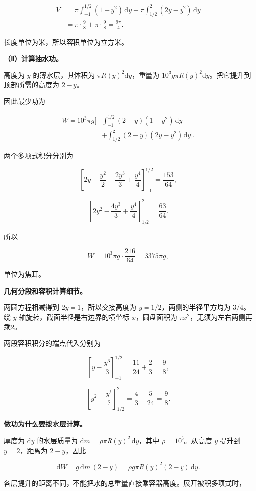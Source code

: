 \documentclass[UTF8,11pt,fontset=windows]{ctexart}
\begin{document}
$$
\begin{aligned}
V&=\pi\int_{-1}^{1/2}(1-y^2)\,\mathrm dy
+\pi\int_{1/2}^2(2y-y^2)\,\mathrm dy\\
&=\pi\cdot\frac98+\pi\cdot\frac98
=\frac{9\pi}{4}.
\end{aligned}
$$

长度单位为米，所以容积单位为立方米。

\textbf{（Ⅱ）计算抽水功。}

高度为 $y$ 的薄水层，其体积为 $\pi R(y)^2\mathrm dy$，重量为 $10^3g\pi R(y)^2\mathrm dy$。把它提升到顶部所需的高度为 $2-y$。

因此最少功为

$$
\begin{aligned}
W=10^3\pi g\bigg[&\int_{-1}^{1/2}(2-y)(1-y^2)\,\mathrm dy\\
&+\int_{1/2}^2(2-y)(2y-y^2)\,\mathrm dy\bigg].
\end{aligned}
$$

两个多项式积分分别为

$$
\left[2y-\frac{y^2}{2}-\frac{2y^3}{3}+\frac{y^4}{4}\right]_{-1}^{1/2}=\frac{153}{64},
$$

$$
\left[2y^2-\frac{4y^3}{3}+\frac{y^4}{4}\right]_{1/2}^{2}=\frac{63}{64}.
$$

所以

$$
W=10^3\pi g\cdot\frac{216}{64}=3375\pi g,
$$

单位为焦耳。

\textbf{几何分段和容积计算细节。}

两圆方程相减得到 $2y=1$，所以交接高度为 $y=1/2$，两侧的半径平方均为 $3/4$。绕 $y$ 轴旋转，截面半径是右边界的横坐标 $x$，圆盘面积为 $\pi x^2$，无须为左右两侧再乘2。

两段容积积分的端点代入分别为

$$
\left[y-\frac{y^3}{3}\right]_{-1}^{1/2}
=\frac{11}{24}+\frac23=\frac98,
$$

$$
\left[y^2-\frac{y^3}{3}\right]_{1/2}^{2}
=\frac43-\frac5{24}=\frac98.
$$

\textbf{做功为什么要按水层计算。}

厚度为 $\mathrm dy$ 的水层质量为 $\mathrm dm=\rho\pi R(y)^2\,\mathrm dy$，其中 $\rho=10^3$。从高度 $y$ 提升到 $y=2$，距离为 $2-y$，因此

$$
\mathrm dW=g\,\mathrm dm\,(2-y)
=\rho g\pi R(y)^2(2-y)\,\mathrm dy.
$$

各层提升的距离不同，不能把水的总重量直接乘容器高度。展开被积多项式时，
\end{document}
